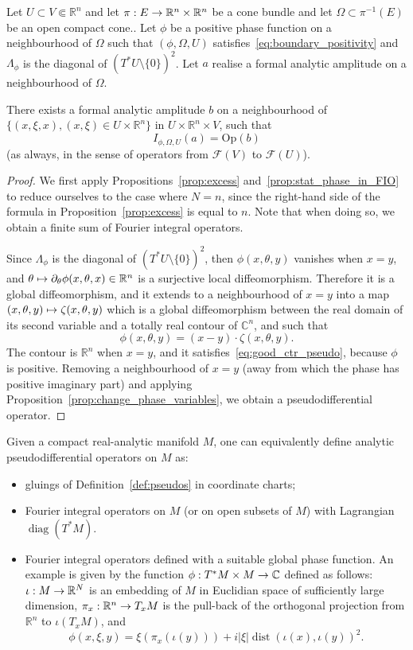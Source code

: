 \documentclass[10pt]{amsart}
\theoremstyle{definition}\newtheorem{defi}[theo]{Definition}\newtheorem{rema}[theo]{Remark}\newtheorem{exam}[theo]{Example}\newtheorem{exem}[theo]{Example}\newtheorem{nota}[theo]{Notation}
\DeclareMathOperator{\diag}{diag}
\DeclareMathOperator{\dist}{dist}
\newcommand{\Opp}{\mathrm{Op}}
\newcommand{\clF}{\mathcal{F}}
\newcommand\1{\mathds{1}}
\newcommand{\R}{\mathbb{R}}
\newcommand{\C}{\mathbb{C}}
\renewcommand*{\to}{\mathchoice{\longrightarrow}{\rightarrow}{\rightarrow}{\rightarrow}}
\let\oldmapsto\mapsto
\renewcommand*{\mapsto}{\mathchoice{\longmapsto}{\oldmapsto}{\oldmapsto}{\oldmapsto}}
\begin{document}
\begin{prop}\label{prop:Kuranishi}
Let $U\subset V\Subset \R^n$ and let $\pi:E\to \R^n\times \R^n$ be a cone bundle and let $\Omega\subset \pi^{-1}(E)$ be an open compact cone.. Let $\phi$ be a positive phase function on a neighbourhood of $\Omega$ such that $(\phi,\Omega,U)$ satisfies~\eqref{eq:boundary_positivity} and $\Lambda_{\phi}$ is the diagonal of $(T^*U\setminus \{0\})^2$. Let $a$ realise a formal analytic amplitude on a neighbourhood of $\Omega$.

There exists a formal analytic amplitude $b$ on a neighbourhood of $\{(x,\xi,x),(x,\xi)\in U\times \R^n\}$ in $U\times \R^n\times V$, such that
\[
I_{\phi,\Omega,U}(a)=\Opp(b)
\]
(as always, in the sense of operators from $\clF(V)$ to $\clF(U)$).
\end{prop}
\begin{proof}
We first apply Propositions~\ref{prop:excess} and~\ref{prop:stat_phase_in_FIO} to reduce ourselves to the case where $N=n$, since the right-hand side of the formula in Proposition~\ref{prop:excess} is equal to $n$. Note that when doing so, we obtain a finite sum of Fourier {integral operators}.

Since $\Lambda_{\phi}$ is the diagonal of $(T^*U\setminus \{0\})^2$, then $\phi(x,\theta,y)$ vanishes when $x=y$, and $\theta\mapsto
\partial_{\theta}\phi(x,\theta,x)\in \R^n$ is a surjective local diffeomorphism. Therefore it is a global diffeomorphism, and it extends to a neighbourhood of $x=y$ into a map $(x,\theta,y)\mapsto
\zeta(x,\theta,y)$ which is a global diffeomorphism between the real domain of its second variable and a totally real contour of $\C^n$, and such that
\[
\phi(x,\theta,y)=(x-y)\cdot \zeta(x,\theta,y).
\]
The contour is $\R^n$ when $x=y$, and it satisfies~\eqref{eq:good_ctr_pseudo}, because $\phi$ is positive. Removing a neighbourhood of $x=y$ (away from which the phase has positive imaginary part) and applying Proposition~\ref{prop:change_phase_variables}, we obtain a pseudodifferential operator.
\end{proof}

\pagebreak
Given a compact real-analytic manifold $M$, one can equivalently define analytic pseudodifferential operators on $M$ as:
\begin{itemize}
\item gluings of Definition~\ref{def:pseudos} in coordinate charts;
\item Fourier integral operators on $M$ (or on open subsets of $M$) with Lagrangian $\diag(T^*M)$.
\item Fourier integral operators defined with a suitable global phase function. An example is given by the function $\phi:T^*M\times M\to
\C$ defined as follows: $\iota:M\to \R^N$ is an embedding of $M$ in Euclidian space of sufficiently large dimension, $\pi_x:\R^n\to T_xM$ is the pull-back of the orthogonal projection from $\R^n$ to $\iota(T_xM)$, and
\[
\phi(x,\xi,y)=\xi(\pi_x(\iota(y)))+i|\xi|\dist(\iota(x),\iota(y))^2.
\]
\end{itemize}
\end{document}
